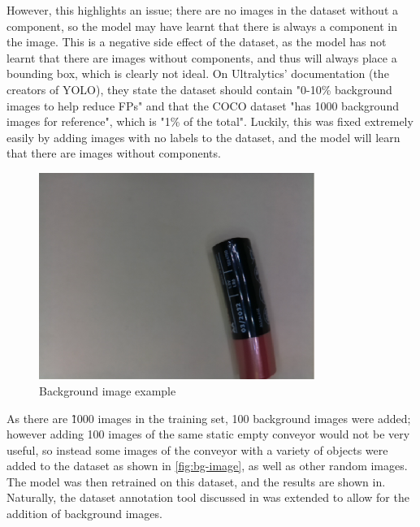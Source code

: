 However, this highlights an issue; there are no images in the dataset without a component, so the model may have learnt that there is always a component in the image. This is a negative side effect of the dataset, as the model has not learnt that there are images without components, and thus will always place a bounding box, which is clearly not ideal. On Ultralytics' documentation \cite{ultralytics_2023} (the creators of YOLO), they state the dataset should contain "0-10\% background images to help reduce FPs" and that the COCO dataset "has 1000 background images for reference", which is "1\% of the total". Luckily, this was fixed extremely easily by adding images with no labels to the dataset, and the model will learn that there are images without components.

\begin{figure}[H]
    \centering
    \includegraphics[width=0.8\textwidth]{imgs/cv/obb_background_1.png}
    \caption{Background image example}
    \label{fig:bg-image}
  \end{figure}
  
  As there are \~1000 images in the training set, 100 background images were added; however adding 100 images of the same static empty conveyor would not be very useful, so instead some images of the conveyor with a variety of objects were added to the dataset as shown in \autoref{fig:bg-image}, as well as other random images. The model was then retrained on this dataset, and the results are shown in. Naturally, the dataset annotation tool discussed in \label{sec:data-annotation-tool} was extended to allow for the addition of background images.
  
